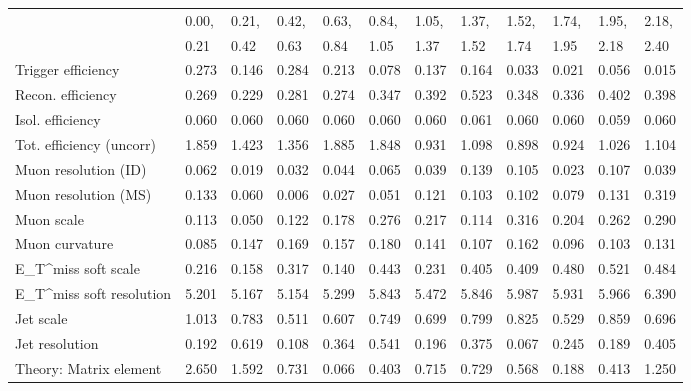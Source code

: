 \begin{tabular}{l|p{0.6cm}p{0.6cm}p{0.6cm}p{0.6cm}p{0.6cm}p{0.6cm}p{0.6cm}p{0.6cm}p{0.6cm}p{0.6cm}p{0.6cm}}
\hline
   & 0.00, & 0.21, & 0.42, & 0.63, & 0.84, & 1.05, & 1.37, & 1.52, & 1.74, & 1.95, & 2.18,  \\ 
   & 0.21 & 0.42 & 0.63 & 0.84 & 1.05 & 1.37 & 1.52 & 1.74 & 1.95 & 2.18 & 2.40  \\ 
\hline
Trigger efficiency                       & 0.273 & 0.146 & 0.284 & 0.213 & 0.078 & 0.137 & 0.164 & 0.033 & 0.021 & 0.056 & 0.015 \\
Recon. efficiency                        & 0.269 & 0.229 & 0.281 & 0.274 & 0.347 & 0.392 & 0.523 & 0.348 & 0.336 & 0.402 & 0.398 \\
Isol. efficiency                         & 0.060 & 0.060 & 0.060 & 0.060 & 0.060 & 0.060 & 0.061 & 0.060 & 0.060 & 0.059 & 0.060 \\
Tot. efficiency (uncorr)                 & 1.859 & 1.423 & 1.356 & 1.885 & 1.848 & 0.931 & 1.098 & 0.898 & 0.924 & 1.026 & 1.104 \\
Muon resolution (ID)                     & 0.062 & 0.019 & 0.032 & 0.044 & 0.065 & 0.039 & 0.139 & 0.105 & 0.023 & 0.107 & 0.039 \\
Muon resolution (MS)                     & 0.133 & 0.060 & 0.006 & 0.027 & 0.051 & 0.121 & 0.103 & 0.102 & 0.079 & 0.131 & 0.319 \\
Muon scale                               & 0.113 & 0.050 & 0.122 & 0.178 & 0.276 & 0.217 & 0.114 & 0.316 & 0.204 & 0.262 & 0.290 \\
Muon curvature                           & 0.085 & 0.147 & 0.169 & 0.157 & 0.180 & 0.141 & 0.107 & 0.162 & 0.096 & 0.103 & 0.131 \\
E_{T}^{miss} soft scale                  & 0.216 & 0.158 & 0.317 & 0.140 & 0.443 & 0.231 & 0.405 & 0.409 & 0.480 & 0.521 & 0.484 \\
E_{T}^{miss} soft resolution             & 5.201 & 5.167 & 5.154 & 5.299 & 5.843 & 5.472 & 5.846 & 5.987 & 5.931 & 5.966 & 6.390 \\
Jet scale                                & 1.013 & 0.783 & 0.511 & 0.607 & 0.749 & 0.699 & 0.799 & 0.825 & 0.529 & 0.859 & 0.696 \\
Jet resolution                           & 0.192 & 0.619 & 0.108 & 0.364 & 0.541 & 0.196 & 0.375 & 0.067 & 0.245 & 0.189 & 0.405 \\
Theory: Matrix element                   & 2.650 & 1.592 & 0.731 & 0.066 & 0.403 & 0.715 & 0.729 & 0.568 & 0.188 & 0.413 & 1.250 \\

\end{tabular}
